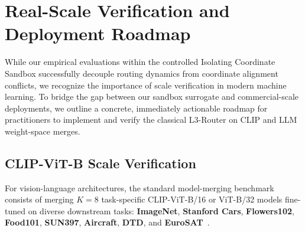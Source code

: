 \section{Real-Scale Verification and Deployment Roadmap}
\label{sec:roadmap_app}

While our empirical evaluations within the controlled Isolating Coordinate Sandbox successfully decouple routing dynamics from coordinate alignment conflicts, we recognize the importance of scale verification in modern machine learning. To bridge the gap between our sandbox surrogate and commercial-scale deployments, we outline a concrete, immediately actionable roadmap for practitioners to implement and verify the classical L3-Router on CLIP and LLM weight-space merges.

\subsection{CLIP-ViT-B Scale Verification}
For vision-language architectures, the standard model-merging benchmark consists of merging $K=8$ task-specific CLIP-ViT-B/16 or ViT-B/32 models fine-tuned on diverse downstream tasks: \textbf{ImageNet}, \textbf{Stanford Cars}, \textbf{Flowers102}, \textbf{Food101}, \textbf{SUN397}, \textbf{Aircraft}, \textbf{DTD}, and \textbf{EuroSAT}~\cite{ilharco2022editing}. 

